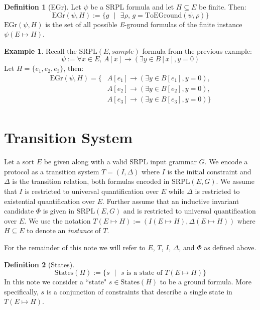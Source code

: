 \documentclass[12pt]{article}
\theoremstyle{definition}
\newtheorem{definition}{Definition}
\newtheorem{example}{Example}
\theoremstyle{remark}
\newcommand{\st}{\text{ }|\text{ }}
\newcommand{\states}{\text{States}}
\newcommand{\gr}{\text{EGr}}
\newcommand{\SRPL}{\text{SRPL}}
\newcommand{\toground}{\text{ToEGround}}
\begin{document}
\begin{definition}[EGr]
  Let $\psi$ be a SRPL formula and let $H \subseteq E$ be finite.  Then:
  $$\gr(\psi,H) := \{g \st \exists \rho, \, g = \toground(\psi,\rho)\}$$
  $\gr(\psi,H)$ is the set of all possible \textit{E}-ground formulas of the finite instance $\psi(E \mapsto H)$.
\end{definition}

\begin{example}
  Recall the $\SRPL(E,sample)$ formula from the previous example:
  $$\psi := \forall x \in E, \, A[x] \rightarrow (\exists y \in B[x], y = 0)$$
  Let $H = \{e_1,e_2,e_3\}$, then:
  \begin{align*}
    \gr(\psi,H) = \{&A[e_1] \rightarrow (\exists y \in B[e_1], y = 0),\\
    &A[e_2] \rightarrow (\exists y \in B[e_2], y = 0),\\
    &A[e_3] \rightarrow (\exists y \in B[e_3], y = 0)\}\\
  \end{align*}
\end{example}



\section{Transition System}

Let a sort $E$ be given along with a valid SRPL input grammar $G$.  We encode a protocol as a transition system $T=(I,\Delta)$ where $I$ is the initial constraint and $\Delta$ is the transition relation, both formulas encoded in $\SRPL(E,G)$.  We assume that $I$ is restricted to universal quantification over $E$ while $\Delta$ is restricted to existential quantification over $E$.  Further assume that an inductive invariant candidate $\Phi$ is given in $\SRPL(E,G)$ and is restricted to universal quantification over $E$.  We use the notation $T(E \mapsto H):=(I(E \mapsto H),\Delta(E \mapsto H))$ where $H \subseteq E$ to denote an \textit{instance} of $T$.

For the remainder of this note we will refer to $E$, $T$, $I$, $\Delta$, and $\Phi$ as defined above.

\begin{definition}[States]
  $$\states(H) := \{s \st s \text{ is a state of } T(E \mapsto H)\}$$
  In this note we consider a ``state" $s \in \states(H)$ to be a ground formula.  More specifically, $s$ is a conjunction of constraints that describe a single state in $T(E \mapsto H)$.
\end{definition}
\end{document}
